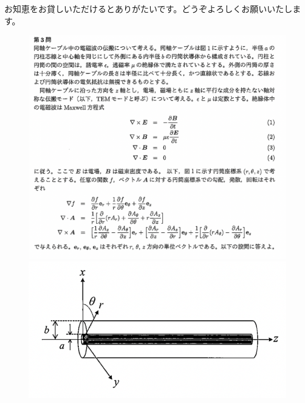 \documentclass[10pt]{ltjsarticle}
\begin{document}
    お知恵をお貸しいただけるとありがたいです。どうぞよろしくお願いいたします。

    \begin{figure}[hbt]
        \centering
        \includegraphics[width=0.7\linewidth,keepaspectratio]{./img/tokyoR4EM.png}
        \includegraphics[width=0.7\linewidth,keepaspectratio]{./img/coaxial.png}
        \label{fig:}
    \end{figure}
    
    
    
\end{document}
